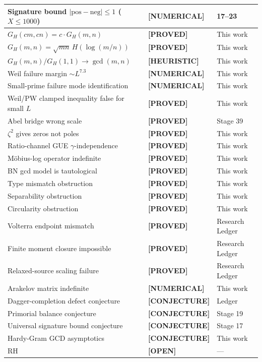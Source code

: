 \documentclass[11pt]{article}
\theoremstyle{remark}
\newcommand{\PROVED}{\textbf{\color{blue}[PROVED]}}
\newcommand{\NUMERICAL}{\textbf{\color{orange}[NUMERICAL]}}
\newcommand{\HEURISTIC}{\textbf{\color{orange!80!black}[HEURISTIC]}}
\newcommand{\OPEN}{\textbf{\color{purple}[OPEN]}}
\newcommand{\CONJECTURE}{\textbf{\color{violet}[CONJECTURE]}}
\DeclareRobustCommand{\_}{\ifmmode\text{\textunderscore}\else\textunderscore\allowbreak\fi}
\begin{document}
\begin{longtable}{p{8cm}ll}
Signature bound $|\text{pos}-\text{neg}| \leq 1$ ($X \leq 1000$) & \NUMERICAL{} & 17--23 \\
\midrule
$G_H(cm,cn) = c \cdot G_H(m,n)$ & \PROVED{} & This work \\
$G_H(m,n) = \sqrt{mn}\,H(\log(m/n))$ & \PROVED{} & This work \\
$G_H(m,n)/G_H(1,1) \to \gcd(m,n)$ & \HEURISTIC{} & This work \\
Weil failure margin $\sim L^{7.3}$ & \NUMERICAL{} & This work \\
Small-prime failure mode identification & \NUMERICAL{} & This work \\
Weil/PW clamped inequality false for small $L$ & \PROVED{} & This work \\
Abel bridge wrong scale & \PROVED{} & Stage 39 \\
$\zeta^2$ gives zeros not poles & \PROVED{} & This work \\
Ratio-channel GUE $\gamma$-independence & \PROVED{} & This work \\
M\"obius-log operator indefinite & \PROVED{} & This work \\
BN gcd model is tautological & \PROVED{} & This work \\
Type mismatch obstruction & \PROVED{} & This work \\
Separability obstruction & \PROVED{} & This work \\
Circularity obstruction & \PROVED{} & This work \\
Volterra endpoint mismatch & \PROVED{} & Research Ledger \\
Finite moment closure impossible & \PROVED{} & Research Ledger \\
Relaxed-source scaling failure & \PROVED{} & Research Ledger \\
Arakelov matrix indefinite & \NUMERICAL{} & This work \\
\midrule
Dagger-completion defect conjecture & \CONJECTURE{} & Ledger \\
Primorial balance conjecture & \CONJECTURE{} & Stage 19 \\
Universal signature bound conjecture & \CONJECTURE{} & Stage 17 \\
Hardy-Gram GCD asymptotics & \CONJECTURE{} & This work \\
\midrule
RH & \OPEN{} & --- \\
\bottomrule
\end{longtable}

\end{document}
